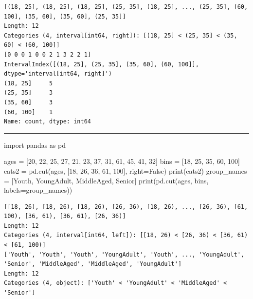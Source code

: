 \documentclass[
  polish,
  letterpaper,
  DIV=11,
  numbers=noendperiod]{scrreprt}
\newenvironment{Shaded}{\begin{snugshade}}{\end{snugshade}}
\newcommand{\BuiltInTok}[1]{\textcolor[rgb]{0.00,0.23,0.31}{#1}}
\newcommand{\DecValTok}[1]{\textcolor[rgb]{0.68,0.00,0.00}{#1}}
\newcommand{\ImportTok}[1]{\textcolor[rgb]{0.00,0.46,0.62}{#1}}
\newcommand{\NormalTok}[1]{\textcolor[rgb]{0.00,0.23,0.31}{#1}}
\newcommand{\OperatorTok}[1]{\textcolor[rgb]{0.37,0.37,0.37}{#1}}
\newcommand{\StringTok}[1]{\textcolor[rgb]{0.13,0.47,0.30}{#1}}
\newcommand{\VariableTok}[1]{\textcolor[rgb]{0.07,0.07,0.07}{#1}}
\begin{document}
\begin{verbatim}
[(18, 25], (18, 25], (18, 25], (25, 35], (18, 25], ..., (25, 35], (60, 100], (35, 60], (35, 60], (25, 35]]
Length: 12
Categories (4, interval[int64, right]): [(18, 25] < (25, 35] < (35, 60] < (60, 100]]
[0 0 0 1 0 0 2 1 3 2 2 1]
IntervalIndex([(18, 25], (25, 35], (35, 60], (60, 100]], dtype='interval[int64, right]')
(18, 25]     5
(25, 35]     3
(35, 60]     3
(60, 100]    1
Name: count, dtype: int64
\end{verbatim}

\begin{center}\rule{0.5\linewidth}{0.5pt}\end{center}

\begin{Shaded}
\begin{Highlighting}[]
\ImportTok{import}\NormalTok{ pandas }\ImportTok{as}\NormalTok{ pd}

\NormalTok{ages }\OperatorTok{=}\NormalTok{ [}\DecValTok{20}\NormalTok{, }\DecValTok{22}\NormalTok{, }\DecValTok{25}\NormalTok{, }\DecValTok{27}\NormalTok{, }\DecValTok{21}\NormalTok{, }\DecValTok{23}\NormalTok{, }\DecValTok{37}\NormalTok{, }\DecValTok{31}\NormalTok{, }\DecValTok{61}\NormalTok{, }\DecValTok{45}\NormalTok{, }\DecValTok{41}\NormalTok{, }\DecValTok{32}\NormalTok{]}
\NormalTok{bins }\OperatorTok{=}\NormalTok{ [}\DecValTok{18}\NormalTok{, }\DecValTok{25}\NormalTok{, }\DecValTok{35}\NormalTok{, }\DecValTok{60}\NormalTok{, }\DecValTok{100}\NormalTok{]}
\NormalTok{cats2 }\OperatorTok{=}\NormalTok{ pd.cut(ages, [}\DecValTok{18}\NormalTok{, }\DecValTok{26}\NormalTok{, }\DecValTok{36}\NormalTok{, }\DecValTok{61}\NormalTok{, }\DecValTok{100}\NormalTok{], right}\OperatorTok{=}\VariableTok{False}\NormalTok{)}
\BuiltInTok{print}\NormalTok{(cats2)}
\NormalTok{group\_names }\OperatorTok{=}\NormalTok{ [}\StringTok{\textquotesingle{}Youth\textquotesingle{}}\NormalTok{, }\StringTok{\textquotesingle{}YoungAdult\textquotesingle{}}\NormalTok{,}
               \StringTok{\textquotesingle{}MiddleAged\textquotesingle{}}\NormalTok{, }\StringTok{\textquotesingle{}Senior\textquotesingle{}}\NormalTok{]}
\BuiltInTok{print}\NormalTok{(pd.cut(ages, bins, labels}\OperatorTok{=}\NormalTok{group\_names))}
\end{Highlighting}
\end{Shaded}

\begin{verbatim}
[[18, 26), [18, 26), [18, 26), [26, 36), [18, 26), ..., [26, 36), [61, 100), [36, 61), [36, 61), [26, 36)]
Length: 12
Categories (4, interval[int64, left]): [[18, 26) < [26, 36) < [36, 61) < [61, 100)]
['Youth', 'Youth', 'Youth', 'YoungAdult', 'Youth', ..., 'YoungAdult', 'Senior', 'MiddleAged', 'MiddleAged', 'YoungAdult']
Length: 12
Categories (4, object): ['Youth' < 'YoungAdult' < 'MiddleAged' < 'Senior']
\end{verbatim}
\end{document}
